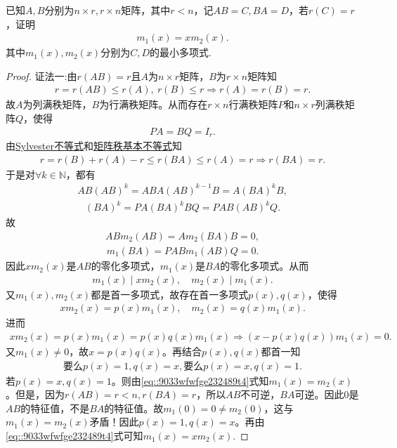 \documentclass[../../main.tex]{subfiles}
\begin{document}
\begin{example}
已知$A,B$分别为$n \times r,r \times n$矩阵，其中$r < n$，记$AB=C,BA=D$，若$r(C)=r$，证明
\begin{align*}
m_1(x) = x m_2(x).
\end{align*}
其中$m_1(x),m_2(x)$分别为$C,D$的最小多项式.
\end{example}
\begin{proof}
{\color{blue}证法一:}由$r(AB) = r$且$A$为$n \times r$矩阵，$B$为$r \times n$矩阵知
\begin{align*}
r = r(AB) \leqslant r(A),\ r(B) \leqslant r \Longrightarrow r(A) = r(B) = r.
\end{align*}
故$A$为列满秩矩阵，$B$为行满秩矩阵。从而存在$r \times n$行满秩矩阵$P$和$n \times r$列满秩矩阵$Q$，使得
\begin{align*}
PA = BQ = I_r.
\end{align*}
由\hyperref[proposition:Sylvester(西尔维斯特)不等式]{Sylvester不等式}和\hyperref[proposition:矩阵秩的基本公式]{矩阵秩基本不等式}知
\begin{align*}
r = r(B) + r(A) - r \leqslant r(BA) \leqslant r(A) = r \Longrightarrow r(BA) = r.
\end{align*}
于是对$\forall k \in \mathbb{N}$，都有
\begin{align*}
AB(AB)^k = ABA(AB)^{k-1}B = A(BA)^kB,
\end{align*}
\begin{align*}
(BA)^k = PA(BA)^kBQ = PAB(AB)^kQ.
\end{align*}
故
\begin{align*}
ABm_2(AB) = Am_2(BA)B = 0,
\end{align*}
\begin{align*}
m_1(BA) = PABm_1(AB)Q = 0.
\end{align*}
因此$xm_2(x)$是$AB$的零化多项式，$m_1(x)$是$BA$的零化多项式。从而
\begin{align*}
m_1(x) \mid xm_2(x),\quad m_2(x) \mid m_1(x).
\end{align*}
又$m_1(x), m_2(x)$都是首一多项式，故存在首一多项式$p(x), q(x)$，使得
\begin{align}
xm_2(x) = p(x)m_1(x),\quad m_2(x) = q(x)m_1(x). \label{eq::9033wfwfge232489t4}
\end{align}
进而
\begin{align*}
xm_2(x) = p(x)m_1(x) = p(x)q(x)m_1(x) \Longrightarrow (x - p(x)q(x))m_1(x) = 0.
\end{align*}
又$m_1(x) \ne 0$，故$x = p(x)q(x)$。再结合$p(x), q(x)$都首一知
\begin{align*}
\text{要么}p(x)=1,q(x)=x,\text{要么}p(x)=x,q(x)=1.
\end{align*}
若$p(x) = x, q(x) = 1$。则由\eqref{eq::9033wfwfge232489t4}式知$m_1(x) = m_2(x)$。但是，因为$r(AB) = r < n, r(BA) = r$，所以$AB$不可逆，$BA$可逆。因此$0$是$AB$的特征值，不是$BA$的特征值。故$m_1(0) = 0 \ne m_2(0)$，这与$m_1(x) = m_2(x)$矛盾！因此$p(x) = 1, q(x) = x$。再由\eqref{eq::9033wfwfge232489t4}式可知$m_1(x) = xm_2(x)$.


\end{proof}
\end{document}
